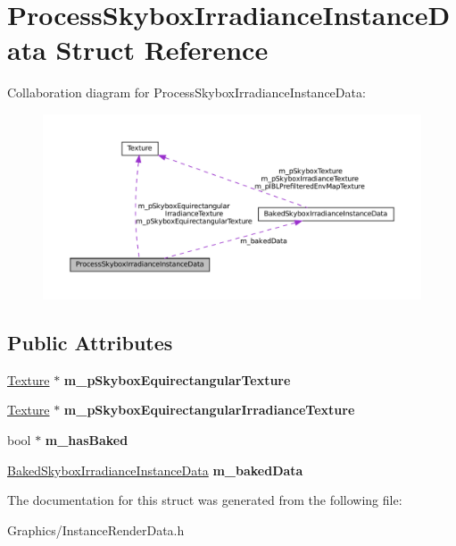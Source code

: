 \hypertarget{structProcessSkyboxIrradianceInstanceData}{}\section{Process\+Skybox\+Irradiance\+Instance\+Data Struct Reference}
\label{structProcessSkyboxIrradianceInstanceData}


Collaboration diagram for Process\+Skybox\+Irradiance\+Instance\+Data\+:\nopagebreak
\begin{figure}[H]
\begin{center}
\leavevmode
\includegraphics[width=350pt]{structProcessSkyboxIrradianceInstanceData__coll__graph}
\end{center}
\end{figure}
\subsection*{Public Attributes}
\begin{DoxyCompactItemize}
\item 
\mbox{\label{structProcessSkyboxIrradianceInstanceData_a9e88265931246132b871d757139bbb99}} 
\hyperlink{classTexture}{Texture} $\ast$ {\bfseries m\+\_\+p\+Skybox\+Equirectangular\+Texture}
\item 
\mbox{\label{structProcessSkyboxIrradianceInstanceData_a97f81f12e7c3ff57fa3c93b3076cb85d}} 
\hyperlink{classTexture}{Texture} $\ast$ {\bfseries m\+\_\+p\+Skybox\+Equirectangular\+Irradiance\+Texture}
\item 
\mbox{\label{structProcessSkyboxIrradianceInstanceData_a4410a7f7a0c627abee935f730bff0007}} 
bool $\ast$ {\bfseries m\+\_\+has\+Baked}
\item 
\mbox{\label{structProcessSkyboxIrradianceInstanceData_aedc9dac38523c921586e4851dfdc0e91}} 
\hyperlink{structBakedSkyboxIrradianceInstanceData}{Baked\+Skybox\+Irradiance\+Instance\+Data} {\bfseries m\+\_\+baked\+Data}
\end{DoxyCompactItemize}


The documentation for this struct was generated from the following file\+:\begin{DoxyCompactItemize}
\item 
Graphics/Instance\+Render\+Data.\+h\end{DoxyCompactItemize}
